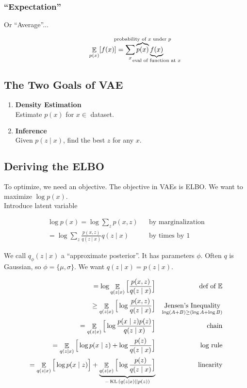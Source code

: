\documentclass{article}
\DeclareMathOperator{\KL}{KL}
\begin{document}
\subsubsection*{``Expectation''}

Or ``Average''...

\[
\mathop{\mathbb{E}}_{p(x)}[f(x)] = \sum_{x} \overbrace{p(x)}^{\mathclap{\text{probability of $x$ under $p$}}} \underbrace{f(x)}_{\mathclap{\text{eval of function at $x$}}}
\]

\subsection*{The Two Goals of VAE}

\begin{enumerate}
    \item 
    \textbf{Density Estimation} \\ Estimate $p(x)$ for $x \in$ dataset. 
    \item
    \textbf{Inference} \\ Given $p(z \mid x)$, find the best $z$ for any $x$.
\end{enumerate}

\subsection*{Deriving the ELBO}

To optimize, we need an objective. The objective in VAEs is ELBO. We want to maximize $\log p(x)$. \\

\noindent Introduce latent variable

\begin{align*}
    \log p(x) = \log \sum_{z} p(x, z) && \text{by marginalization} \\
    = \log \sum_{z} \frac{p(x, z)}{q(z \mid x)} q(z \mid x) && \text{by times by $1$}
\end{align*}

\noindent We call $q_{\phi}(z \mid x)$ a ``approximate posterior''.
It has parameters $\phi$.
Often $q$ is Gaussian, so $\phi = \{ \mu, \sigma \}$.
We want $q(z \mid x) = p(z \mid x)$.

\begin{align*}
    = \log \mathop{\mathbb{E}}_{q(z \mid x)}
    \Big[ \frac{p(x, z)}{q(z \mid x)} \Big] && 
    \text{def of $\mathbb{E}$} \\
    \geq \mathop{\mathbb{E}}_{q(z \mid x)} \Big[ \log \frac{p(x, z)}{q(z \mid x)} \Big] &&
    \underset{\log(A + B) \geq (\log A + \log B)}{\text{Jensen's Inequality}} \\
    = \mathop{\mathbb{E}}_{q(z \mid x)} \Big[ \log \frac{p(x \mid z)p(z)}{q(z \mid x)} \Big] && \text{chain} \\
    = \mathop{\mathbb{E}}_{q(z \mid x)} \Big[ \log p(x \mid z) + \log \frac{p(z)}{q(z \mid x)} \Big] && \text{log rule} \\
    = \mathop{\mathbb{E} }_{q(z \mid x)} \Big[ \log p(x \mid z) \Big]
    + 
    \underbrace{\mathop{\mathbb{E}}_{q(z \mid x)} \Big[ \log \frac{p(z)}{q(z \mid x)} \Big]}_{\mathclap{-\KL{(q(z \mid x)} \mid \mid p(z)) }} && \text{linearity}
\end{align*}
\end{document}
